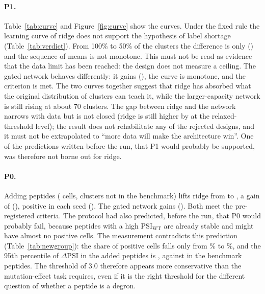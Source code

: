 \paragraph{P1.} Table~\ref{tab:curve} and Figure~\ref{fig:curve} show the curves. Under the fixed rule the learning curve of ridge does not support the hypothesis of label shortage
(Table~\ref{tab:verdict}). From 100\% to 50\% of the clusters the difference is only \nPoneRidgeD{} (\nPoneRidgeCI{}) and
the sequence of means is not monotone. This must not be read as evidence that the data limit has been reached: the design does not
measure a ceiling. The gated network behaves differently: it gains \nPoneGateD{} (\nPoneGateCI{}), the curve is
monotone, and the criterion is met. The two curves together suggest that ridge has absorbed what the original
distribution of clusters can teach it, while the larger-capacity network is still rising at about 70 clusters.
The gap between ridge and the network narrows with data but is not closed (ridge is still higher by \nGapExt{}
at the relaxed-threshold level); the result does not rehabilitate any of the rejected designs, and it must
not be extrapolated to ``more data will make the architecture win''. One of the predictions written before the run,
that P1 would probably be supported, was therefore not borne out for ridge.

\paragraph{P0.} Adding \nNNewPep{} peptides (\nNNewCells{} cells, \nNNewClu{} clusters not in the benchmark) lifts ridge from
\nAucRidge{} to \nAucRidgeExt{}, a gain of \nPzeroRidgeD{} (\nPzeroRidgeCI{}), positive in each seed
(\nPzeroRidgeSeeds). The gated network gains \nPzeroGateD{} (\nPzeroGateCI{}). Both meet the pre-registered
criteria. The protocol had also predicted, before the run, that P0 would probably fail, because
peptides with a high $\mathrm{PSI}_{\mathrm{WT}}$ are already stable and might have almost no positive cells.
The measurement contradicts this prediction (Table~\ref{tab:newgroup}): the share of positive cells falls only from
\nPosBase\% to \nPosNew\%, and the 95th percentile of $\Delta\mathrm{PSI}$ in the added peptides is \nDpsiPNinetyFiveNew{}, against \nDpsiPNinetyFiveBase{} in the benchmark peptides. The threshold of 3.0
therefore appears more conservative than the mutation-effect task requires, even if it is the right threshold
for the different question of whether a peptide is a degron.

